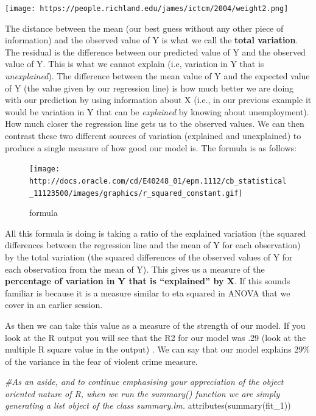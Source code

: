 \documentclass[
]{book}
\newenvironment{Shaded}{\begin{snugshade}}{\end{snugshade}}
\newcommand{\CommentTok}[1]{\textcolor[rgb]{0.56,0.35,0.01}{\textit{#1}}}
\newcommand{\FunctionTok}[1]{\textcolor[rgb]{0.00,0.00,0.00}{#1}}
\newcommand{\NormalTok}[1]{#1}
\begin{document}
\texttt{[image: https://people.richland.edu/james/ictcm/2004/weight2.png]}

The distance between the mean (our best guess without any other piece of information) and the observed value of Y is what we call the \textbf{total variation}. The residual is the difference between our predicted value of Y and the observed value of Y. This is what we cannot explain (i.e, variation in Y that is \emph{unexplained}). The difference between the mean value of Y and the expected value of Y (the value given by our regression line) is how much better we are doing with our prediction by using information about X (i.e., in our previous example it would be variation in Y that can be \emph{explained} by knowing about unemployment). How much closer the regression line gets us to the observed values. We can then contrast these two different sources of variation (explained and unexplained) to produce a single measure of how good our model is. The formula is as follows:

\begin{figure}
\centering
\texttt{[image: http://docs.oracle.com/cd/E40248\_01/epm.1112/cb\_statistical\_11123500/images/graphics/r\_squared\_constant.gif]}
\caption{formula}
\end{figure}

All this formula is doing is taking a ratio of the explained variation (the squared differences between the regression line and the mean of Y for each observation) by the total variation (the squared differences of the observed values of Y for each observation from the mean of Y). This gives us a measure of the \textbf{percentage of variation in Y that is ``explained'' by X}. If this sounds familiar is because it is a measure similar to eta squared in ANOVA that we cover in an earlier session.

As then we can take this value as a measure of the strength of our model. If you look at the R output you will see that the R2 for our model was .29 (look at the multiple R square value in the output) . We can say that our model explains 29\% of the variance in the fear of violent crime measure.

\begin{Shaded}
\begin{Highlighting}[]
\CommentTok{\#As an aside, and to continue emphasising your appreciation of the object oriented nature of R, when we run the summary() function we are simply generating a list object of the class summary.lm.}
\FunctionTok{attributes}\NormalTok{(}\FunctionTok{summary}\NormalTok{(fit\_1))}
\end{Highlighting}
\end{Shaded}
\end{document}

